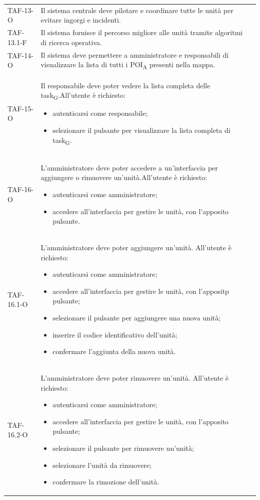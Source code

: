 \begin{longtable}{ >{\centering}p{} >{}p{}
		>{\centering}p{}}
	TAF-13-O & Il sistema centrale deve pilotare e coordinare tutte le unità per evitare ingorgi e incidenti. & 0\tabularnewline
	
	TAF-13.1-F & Il sistema fornisce il percorso migliore alle unità tramite algoritmi di ricerca operativa. & 0\tabularnewline
	
	TAF-14-O & Il sistema deve permettere a amministratore e responsabili di visualizzare la lista di tutti i \acrshort{POI}\textsubscript{A} presenti nella mappa. & 0\tabularnewline
	
	TAF-15-O & Il responsabile deve poter vedere la lista completa delle \gls{task}\textsubscript{G}.\newline All'utente è richiesto:\begin{itemize} \item autenticarsi come responsabile; \item selezionare il pulsante per visualizzare la lista completa di \gls{task}\textsubscript{G}. \end{itemize} & 0\tabularnewline
	
	TAF-16-O & L'amministratore deve poter accedere a un'interfaccia per aggiungere o rimuovere un'unità.\newline All'utente è richiesto: \begin{itemize} \item autenticarsi come amministratore; \item accedere all'interfaccia per gestire le unità, con l'apposito pulsante.\end{itemize} & 0\tabularnewline
	
	TAF-16.1-O & L'amministratore deve poter aggiungere un'unità. \newline All'utente è richiesto: \begin{itemize} \item autenticarsi come amministratore; \item accedere all'interfaccia per gestire le unità, con l'appositp pulsante; \item selezionare il pulsante per aggiungere una nuova unità; \item inserire il codice identificativo dell'unità; \item confermare l'aggiunta della nuova unità.\end{itemize} & 0\tabularnewline
	
	TAF-16.2-O & L'amministratore deve poter rimuovere un'unità. \newline All'utente è richiesto: \begin{itemize} \item autenticarsi come amministratore; \item accedere all'interfaccia per gestire le unità, con l'apposito pulsante; \item selezionare il pulsante per rimuovere un'unità; \item selezionare l'unità da rimuovere; \item confermare la rimozione dell'unità.\end{itemize} & 0\tabularnewline
	

\end{longtable}
